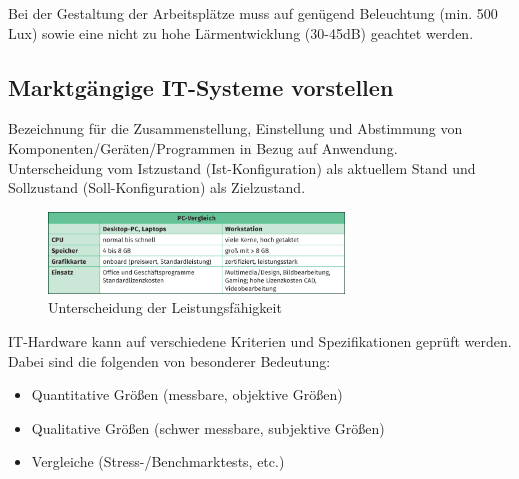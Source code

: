     \begin{subindent}
        Bei der Gestaltung der Arbeitsplätze muss auf genügend Beleuchtung (min. 500 Lux) sowie eine nicht zu hohe Lärmentwicklung (30-45dB) geachtet werden.
    \end{subindent}

\subsection{Marktgängige IT-Systeme vorstellen}
    \begin{tcolorbox}[width=15cm, center, title=Konfiguration, coltitle=white, colframe=orange, colback=white!60!orange]
        Bezeichnung für die Zusammenstellung, Einstellung und Abstimmung von Komponenten/Geräten/Programmen in Bezug auf Anwendung. \\
        Unterscheidung vom Istzustand (Ist-Konfiguration) als aktuellem Stand und Sollzustand (Soll-Konfiguration) als Zielzustand.
    \end{tcolorbox}
    \vspace{-1em}
    
    \begin{figure}[h]
        \centering
        \includegraphics[width=0.7\textwidth]{./images/2.2.2_pc-vergleich.png}
        \caption{Unterscheidung der Leistungsfähigkeit}\label{fig:Leistungsfähigkeit_Unterscheidung}
    \end{figure}
    
    \begin{subindent}
        IT-Hardware kann auf verschiedene Kriterien und Spezifikationen geprüft werden. \\
        Dabei sind die folgenden von besonderer Bedeutung:
    \end{subindent}
    
    \begin{itemize}[leftmargin=2.5cm, topsep=0.3em, itemsep=0.1em, parsep=0.5em]
        \item Quantitative Größen (messbare, objektive Größen)
        \item Qualitative Größen (schwer messbare, subjektive Größen)
        \item Vergleiche (Stress-/Benchmarktests, etc.)
    \end{itemize}
    
